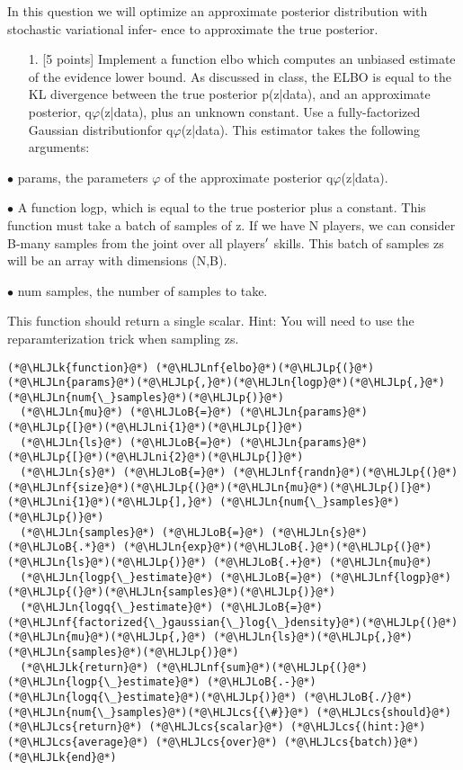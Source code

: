 \documentclass[12pt,a4paper]{article}
\newcommand{\HLJLk}[1]{\textcolor[RGB]{148,91,176}{\textbf{#1}}}
\newcommand{\HLJLn}[1]{#1}
\newcommand{\HLJLnf}[1]{\textcolor[RGB]{66,102,213}{#1}}
\newcommand{\HLJLni}[1]{\textcolor[RGB]{59,151,46}{#1}}
\newcommand{\HLJLoB}[1]{\textcolor[RGB]{102,102,102}{\textbf{#1}}}
\newcommand{\HLJLp}[1]{#1}
\newcommand{\HLJLcs}[1]{\textcolor[RGB]{153,153,119}{\textit{#1}}}
\begin{document}
In this question we will optimize an approximate posterior distribution with stochastic variational infer- ence to approximate the true posterior.

\begin{itemize}
\item[1. ] [5 points] Implement a function elbo which computes an unbiased estimate of the evidence lower bound. As discussed in class, the ELBO is equal to the KL divergence between the true posterior p(z|data), and an approximate posterior, q\ensuremath{\varphi}(z|data), plus an unknown constant. Use a fully-factorized Gaussian distributionfor q\ensuremath{\varphi}(z|data). This estimator takes the following arguments:

\end{itemize}
\ensuremath{\bullet} params, the parameters \ensuremath{\varphi} of the approximate posterior q\ensuremath{\varphi}(z|data).

\ensuremath{\bullet} A function logp, which is equal to the true posterior plus a constant. This function must take a batch of samples of z. If we have N players, we can consider B-many samples from the joint over all players\ensuremath{\rq} skills. This batch of samples zs will be an array with dimensions (N,B).

\ensuremath{\bullet} num samples, the number of samples to take.

This function should return a single scalar. Hint: You will need to use the reparamterization trick when sampling zs.


\begin{lstlisting}
(*@\HLJLk{function}@*) (*@\HLJLnf{elbo}@*)(*@\HLJLp{(}@*)(*@\HLJLn{params}@*)(*@\HLJLp{,}@*)(*@\HLJLn{logp}@*)(*@\HLJLp{,}@*)(*@\HLJLn{num{\_}samples}@*)(*@\HLJLp{)}@*)
  (*@\HLJLn{mu}@*) (*@\HLJLoB{=}@*) (*@\HLJLn{params}@*)(*@\HLJLp{[}@*)(*@\HLJLni{1}@*)(*@\HLJLp{]}@*)
  (*@\HLJLn{ls}@*) (*@\HLJLoB{=}@*) (*@\HLJLn{params}@*)(*@\HLJLp{[}@*)(*@\HLJLni{2}@*)(*@\HLJLp{]}@*)
  (*@\HLJLn{s}@*) (*@\HLJLoB{=}@*) (*@\HLJLnf{randn}@*)(*@\HLJLp{(}@*)(*@\HLJLnf{size}@*)(*@\HLJLp{(}@*)(*@\HLJLn{mu}@*)(*@\HLJLp{)[}@*)(*@\HLJLni{1}@*)(*@\HLJLp{],}@*) (*@\HLJLn{num{\_}samples}@*)(*@\HLJLp{)}@*)
  (*@\HLJLn{samples}@*) (*@\HLJLoB{=}@*) (*@\HLJLn{s}@*) (*@\HLJLoB{.*}@*) (*@\HLJLn{exp}@*)(*@\HLJLoB{.}@*)(*@\HLJLp{(}@*)(*@\HLJLn{ls}@*)(*@\HLJLp{)}@*) (*@\HLJLoB{.+}@*) (*@\HLJLn{mu}@*)
  (*@\HLJLn{logp{\_}estimate}@*) (*@\HLJLoB{=}@*) (*@\HLJLnf{logp}@*)(*@\HLJLp{(}@*)(*@\HLJLn{samples}@*)(*@\HLJLp{)}@*)
  (*@\HLJLn{logq{\_}estimate}@*) (*@\HLJLoB{=}@*) (*@\HLJLnf{factorized{\_}gaussian{\_}log{\_}density}@*)(*@\HLJLp{(}@*)(*@\HLJLn{mu}@*)(*@\HLJLp{,}@*) (*@\HLJLn{ls}@*)(*@\HLJLp{,}@*) (*@\HLJLn{samples}@*)(*@\HLJLp{)}@*)
  (*@\HLJLk{return}@*) (*@\HLJLnf{sum}@*)(*@\HLJLp{(}@*)(*@\HLJLn{logp{\_}estimate}@*) (*@\HLJLoB{.-}@*) (*@\HLJLn{logq{\_}estimate}@*)(*@\HLJLp{)}@*) (*@\HLJLoB{./}@*) (*@\HLJLn{num{\_}samples}@*)(*@\HLJLcs{{\#}}@*) (*@\HLJLcs{should}@*) (*@\HLJLcs{return}@*) (*@\HLJLcs{scalar}@*) (*@\HLJLcs{(hint:}@*) (*@\HLJLcs{average}@*) (*@\HLJLcs{over}@*) (*@\HLJLcs{batch)}@*)
(*@\HLJLk{end}@*)
\end{lstlisting}
\end{document}
